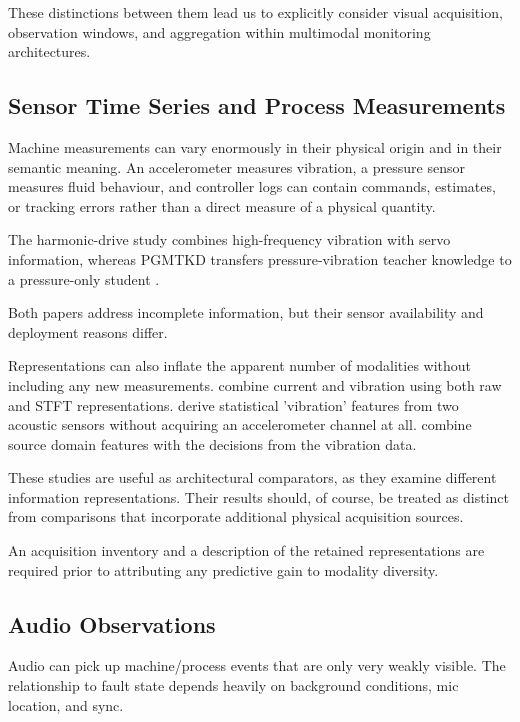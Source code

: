 These distinctions between them lead us to explicitly consider visual acquisition, observation
windows, and aggregation within multimodal monitoring architectures.

\subsection{Sensor Time Series and Process Measurements}

Machine measurements can vary enormously in their physical origin and in their semantic meaning. An
accelerometer measures vibration, a pressure sensor measures fluid behaviour, and controller logs
can contain commands, estimates, or tracking errors rather than a direct measure of a physical
quantity.

The harmonic-drive study combines high-frequency vibration with servo information, whereas PGMTKD
transfers pressure-vibration teacher knowledge to a pressure-only student
\parencite{Yang2024Fault,Li2025PGMTKD}.

Both papers address incomplete information, but their sensor availability and deployment reasons
differ.

Representations can also inflate the apparent number of modalities without including any new
measurements. \textcite{Kullu2022A} combine current and vibration using both raw and STFT representations.
\textcite{Wan2024Pipeline} derive statistical 'vibration' features from two acoustic sensors
without acquiring an accelerometer channel at all. \textcite{Wang2025A} combine
source domain features with the decisions from the vibration data.

These studies are useful as architectural comparators, as they examine different information
representations. Their results should, of course, be treated as distinct from comparisons that
incorporate additional physical acquisition sources.

An acquisition inventory and a description of the retained representations are required prior to
attributing any predictive gain to modality diversity.

\subsection{Audio Observations}

Audio can pick up machine/process events that are only very weakly visible. The relationship to
fault state depends heavily on background conditions, mic location, and sync.

